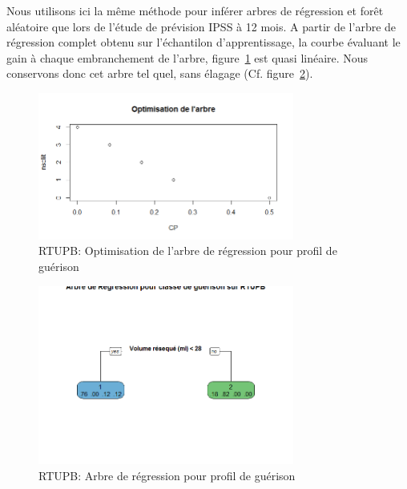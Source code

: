 %
%

%

Nous utilisons ici la même méthode pour inférer arbres de régression et forêt aléatoire que lors de l'étude de prévision IPSS à 12 mois. A partir de l'arbre de régression complet obtenu sur l'échantilon d'apprentissage, la courbe évaluant le gain à chaque embranchement de l'arbre, figure~\ref{fig-rtupb-regtree-optim-healing-class} est quasi linéaire. Nous conservons donc cet arbre tel quel, sans élagage (Cf. figure~\ref{fig-rtupb-regtree-healing-class}).

\begin{figure}[H]
\centering
\includegraphics[width=0.75\textwidth]{../Fig/RTUPB/rtupb-regtree-optim-healing-class.png}
\caption{RTUPB: Optimisation de l'arbre de régression pour profil de guérison}
\label{fig-rtupb-regtree-optim-healing-class}
\end{figure}

\begin{figure}[H]
\centering
\includegraphics[width=0.75\textwidth]{../Fig/RTUPB/rtupb-regtree-healing-class.png}
\caption{RTUPB: Arbre de régression pour profil de guérison}
\label{fig-rtupb-regtree-healing-class}
\end{figure}

